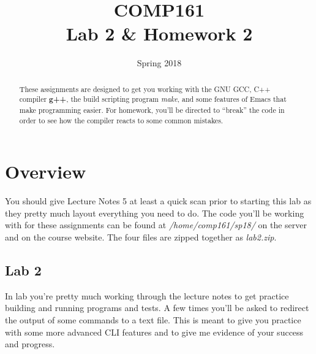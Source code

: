 \documentclass[nobib]{tufte-handout}
\title{COMP161 \\ Lab 2 \& Homework 2}
\author{}
\date{Spring 2018}
\begin{document}
\maketitle

\begin{abstract}
These assignments are designed to get you working with the GNU GCC, C++ compiler \textbf{g++}, the build scripting program \textit{make}, and some features of Emacs that make programming easier. For homework, you'll be directed to ``break'' the code in order to see how the compiler reacts to some common mistakes.
\end{abstract}

\section{Overview}

You should give Lecture Notes 5 at least a quick scan prior to starting this lab as they pretty much layout everything you need to do. The code you'll be working with for these assignments can be found at \textit{/home/comp161/sp18/} on the server and on the course website. The four files are zipped together as \textit{lab2.zip}.

\subsection{Lab 2}

In lab you're pretty much working through the lecture notes to get practice building and running programs and tests.  A few times you'll be asked to redirect the output of some commands to a text file.  This is meant to give you practice with some more advanced CLI features and to give me evidence of your success and progress.
\end{document}
